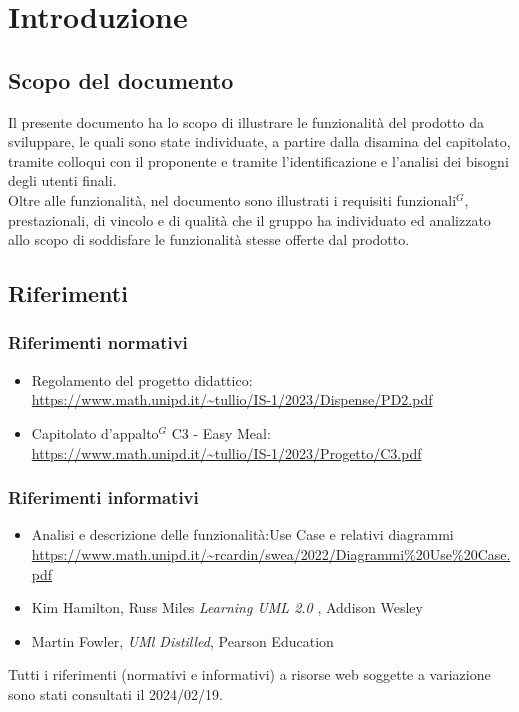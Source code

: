 
\section{Introduzione}

\subsection{Scopo del documento}

Il presente documento ha lo scopo di illustrare le funzionalità del prodotto da sviluppare,
le quali sono state individuate, a partire dalla disamina del capitolato, tramite colloqui con 
il proponente e tramite l'identificazione e l'analisi dei bisogni degli utenti finali.\\
Oltre alle funzionalità, nel documento sono illustrati i requisiti funzionali$^{G}$, prestazionali, di 
vincolo e di qualità che il gruppo ha individuato ed analizzato allo scopo di soddisfare le 
funzionalità stesse offerte dal prodotto. 

\subsection{Riferimenti}
\subsubsection{Riferimenti normativi}

\begin{itemize}
    \item Regolamento del progetto didattico: \\
    \url{https://www.math.unipd.it/~tullio/IS-1/2023/Dispense/PD2.pdf}
    \item Capitolato d’appalto$^{G}$ C3 - Easy Meal: \\
    \url{https://www.math.unipd.it/~tullio/IS-1/2023/Progetto/C3.pdf}
\end{itemize}

\subsubsection{Riferimenti informativi} 

\begin{itemize}
    \item Analisi e descrizione delle funzionalità:Use Case e relativi diagrammi \\
    \url{https://www.math.unipd.it/~rcardin/swea/2022/Diagrammi%20Use%20Case.pdf}
    \item Kim Hamilton, Russ Miles \emph{Learning UML 2.0 }, Addison Wesley \\
    \item Martin Fowler, \emph{UMl Distilled}, Pearson Education

\end{itemize}

Tutti i riferimenti (normativi e informativi) a risorse web soggette a variazione sono stati consultati il 2024/02/19.